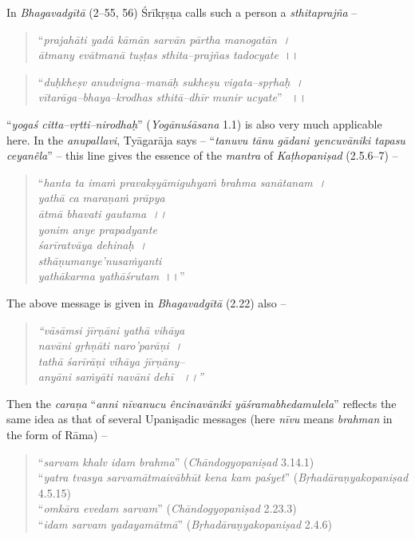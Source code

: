 In \textit{Bhagavadgītā} (2–55, 56) Śrīkṛṣṇa calls such a person a \textit{sthitaprajña} –

\begin{verse}
“\textit{prajahāti yadā kāmān sarvān pārtha manogatān~।}\\\textit{ātmany evātmanā tuṣṭas sthita–prajñas tadocyate}~।।
\end{verse}

\begin{verse}
“\textit{duḥkheṣv anudvigna–manāḥ sukheṣu vigata–spṛhaḥ~।}\\\textit{vītarāga–bhaya–krodhas sthitā–dhīr munir ucyate}”  ।।
\end{verse}

“\textit{yogaś citta–vṛtti–nirodhaḥ}” (\textit{Yogānuśāsana} 1.1) is also very much applicable here. In the \textit{anupallavi}, Tyāgarāja says – “\textit{tanuvu tānu gādani yencuvāniki tapasu ceyanêla}” – this line gives the essence of the \textit{mantra} of \textit{Kaṭhopaniṣad} (2.5.6–7) –

\begin{verse}
“\textit{hanta ta imaṁ pravakṣyāmi}\textit{guhyaṁ brahma sanātanam~।}\\\textit{yathā ca maraṇaṁ prāpya}\\\textit{ātmā bhavati gautama~।।}\\\textit{yonim anye prapadyante}\\\textit{śarīratvāya dehinaḥ~।}\\\textit{sthāṇumanye’nusaṁyanti}\\\textit{yathākarma yathāśrutam}~।।”
\end{verse}

The above message is given in \textit{Bhagavadgītā} (2.22) also –

\begin{verse}
\textit{“vāsāmsi jīrṇāni yathā vihāya}\\\textit{navāni gṛhṇāti naro’parāṇi~।}\\\textit{tathā śarīrāṇi vihāya jīrṇāny–}\\\textit{anyāni saṁyāti navāni dehī  ।।”}
\end{verse}

Then the \textit{caraṇa} “\textit{anni nīvanucu êncinavāniki yāśramabhedamulela}” reflects the same idea as that of several Upaniṣadic messages (here \textit{nīvu} means \textit{brahman} in the form of Rāma) –

\begin{verse}
“\textit{sarvam khalv idam brahma}” (\textit{Chāndogyopaniṣad} 3.14.1)\\ “\textit{yatra tvasya sarvamātmaivābhūt kena kam paśyet}” (\textit{Bṛhadāraṇyakopaniṣad} 4.5.15)\\ “\textit{omkāra evedam sarvam}” (\textit{Chāndogyopaniṣad} 2.23.3)\\ “\textit{idam sarvam yadayamātmā}” (\textit{Bṛhadāraṇyakopaniṣad} 2.4.6)
\end{verse}


